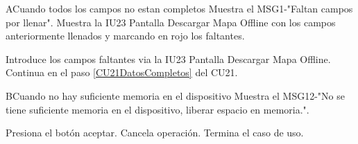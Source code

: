 \begin{UCtrayectoriaA}{A}{Cuando todos los campos no estan completos}
	\UCpaso Muestra el MSG1-"Faltan campos por llenar".
	\UCpaso Muestra la IU23 Pantalla Descargar Mapa Offline con los campos anteriormente llenados y marcando en rojo los faltantes.
	\item\UCactor Introduce los campos faltantes via la IU23 Pantalla Descargar Mapa Offline.
	\UCpaso Continua en el paso \ref{CU21DatosCompletos} del CU21.
\end{UCtrayectoriaA}

\begin{UCtrayectoriaA}{B}{Cuando no hay suficiente memoria en el dispositivo}
	\UCpaso Muestra el MSG12-"No se tiene suficiente memoria en el dispositivo, liberar espacio en memoria.".
	\item\UCactor Presiona el botón aceptar.
	\UCpaso Cancela operación.	
	\UCpaso[] Termina el caso de uso.
\end{UCtrayectoriaA}